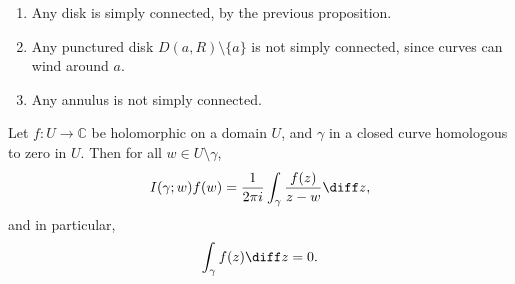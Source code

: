 \documentclass[12pt]{article}
\begin{document}
\begin{exbox}
	\begin{enumerate}
		\item Any disk is simply connected, by the previous proposition.
		\item Any punctured disk $D(a, R) \setminus \{a\}$ is not simply connected, since curves can wind around $a$.
		\item Any annulus is not simply connected.
	\end{enumerate}
\end{exbox}

\begin{theorem}
	Let $f : U \to \mathbb{C}$ be holomorphic on a domain $U$, and $\gamma$ in a closed curve homologous to zero in $U$. Then for all $w \in U \setminus \gamma$,
	\[
	I(\gamma ; w) f(w) = \frac{1}{2 \pi i} \int_{\gamma} \frac{f(z)}{z - w} \diff z
	,\]
	and in particular,
	\[
	\int_{\gamma}f(z) \diff z = 0
	.\]
\end{theorem}
\end{document}
